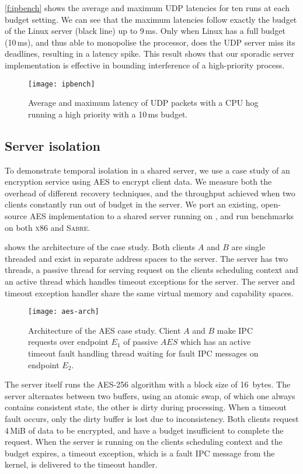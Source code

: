 \autoref{f:ipbench} shows the average and maximum \gls{UDP} latencies for
ten runs at each budget setting. We can see that the maximum latencies
follow exactly the budget of the Linux server (black line) up to 9\,ms. Only
when Linux has a full budget (10\,ms), and thus able to monopolise the
processor, does the UDP server miss its deadlines, resulting in a
latency spike.  This result shows that our sporadic server implementation is effective in bounding
interference of a high-priority process.

\begin{figure}[h]
  \centering
  \texttt{[image: ipbench]}
  \caption{Average and maximum latency of UDP packets with a CPU hog running a high priority with a 10\,ms budget.}
  \label{f:ipbench}
\end{figure}

\subsection{Server isolation} 
\label{s:server-isolation}

To demonstrate temporal isolation in a shared server, we use a case study of an encryption service
using \gls{AES} to encrypt client data. We measure both the overhead of different
recovery techniques, and the throughput achieved when two clients constantly run out of budget in the server. 
We port an existing, open-source \gls{AES} implementation to a shared server running on \selfour, and run
benchmarks on both \textsc{x86} and \textsc{Sabre}.

 shows the architecture of the case study. Both clients $A$ and $B$ are single
 threaded and exist in separate address spaces to the server. The server has two threads, a passive
 thread for serving request on the clients scheduling context and an active thread which handles
 timeout exceptions for the server. The server and timeout exception handler share the same virtual
 memory and capability spaces.

\begin{figure}
\centering
\texttt{[image: aes-arch]}
\caption{Architecture of the \gls{AES} case study. Client $A$ and $B$ make \gls{IPC} requests over
endpoint $E_{1}$ of passive $AES$ which has an active timeout fault handling thread waiting for
fault \gls{IPC} messages on endpoint $E_{2}$.}
\label{f:aes-arch}
\end{figure}

The server itself runs the AES-256 algorithm with a block size of 16~bytes. The server alternates between two
buffers, using an atomic swap, of which one always contains consistent state, the other is
dirty during processing. When a timeout fault occurs, only the dirty buffer is lost due to
inconsistency. Both clients request 4\,MiB of data to be encrypted, and have a budget insufficient to
complete the request. When the server is running on the clients scheduling context and the budget
expires, a timeout exception, which is a fault IPC message from the kernel, is delivered to the timeout
handler. 

